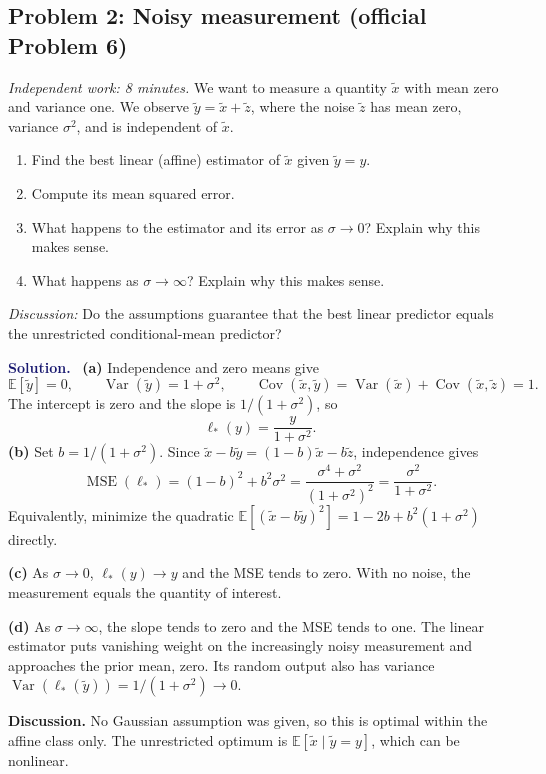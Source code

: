 \documentclass[11pt]{article}
\newcommand{\rv}[1]{\widetilde{#1}}
\newcommand{\E}{\mathbb E}
\newcommand{\Var}{\operatorname{Var}}
\newcommand{\Cov}{\operatorname{Cov}}
\newcommand{\MSE}{\operatorname{MSE}}
\newenvironment{answer}{\par\medskip\noindent\textcolor{MidnightBlue}{\textbf{Solution.}}\ }{\par\medskip}
\newcommand{\workingspace}[1]{}
\newcommand{\workingspace}[1]{\vspace{#1}}
\begin{document}
\subsection*{Problem 2: Noisy measurement (official Problem 6)}
\noindent\textit{Independent work: 8 minutes.}
We want to measure a quantity $\rv x$ with mean zero and variance one.
We observe $\rv y=\rv x+\rv z$, where the noise $\rv z$ has mean zero,
variance $\sigma^2$, and is independent of $\rv x$.
\begin{enumerate}
 \item Find the best linear (affine) estimator of $\rv x$ given $\rv y=y$.
 \item Compute its mean squared error.
 \item What happens to the estimator and its error as $\sigma\to0$?
 Explain why this makes sense.
 \item What happens as $\sigma\to\infty$? Explain why this makes sense.
\end{enumerate}
\noindent\textit{Discussion:} Do the assumptions guarantee that the best linear
predictor equals the unrestricted conditional-mean predictor?
\workingspace{10cm}
\begin{answer}
\textbf{(a)} Independence and zero means give
\[
 \E[\rv y]=0,\qquad \Var(\rv y)=1+\sigma^2,\qquad
 \Cov(\rv x,\rv y)=\Var(\rv x)+\Cov(\rv x,\rv z)=1.
\]
The intercept is zero and the slope is $1/(1+\sigma^2)$, so
\[
 \boxed{\ell_*(y)=\frac{y}{1+\sigma^2}.}
\]
\textbf{(b)} Set $b=1/(1+\sigma^2)$. Since
$\rv x-b\rv y=(1-b)\rv x-b\rv z$, independence gives
\[
 \MSE(\ell_*)=(1-b)^2+b^2\sigma^2
 =\frac{\sigma^4+\sigma^2}{(1+\sigma^2)^2}
 =\boxed{\frac{\sigma^2}{1+\sigma^2}}.
\]
Equivalently, minimize the quadratic
$\E[(\rv x-b\rv y)^2]=1-2b+b^2(1+\sigma^2)$ directly.

\textbf{(c)} As $\sigma\to0$, $\ell_*(y)\to y$ and the MSE tends to zero.
With no noise, the measurement equals the quantity of interest.

\textbf{(d)} As $\sigma\to\infty$, the slope tends to zero and the MSE tends
to one. The linear estimator puts vanishing weight on the increasingly noisy
measurement and approaches the prior mean, zero. Its random output also
has variance $\Var(\ell_*(\rv y))=1/(1+\sigma^2)\to0$.

\textbf{Discussion.} No Gaussian assumption was given, so this is optimal
within the affine class only. The unrestricted optimum is
$\E[\rv x\mid\rv y=y]$, which can be nonlinear.
\end{answer}
\end{document}
